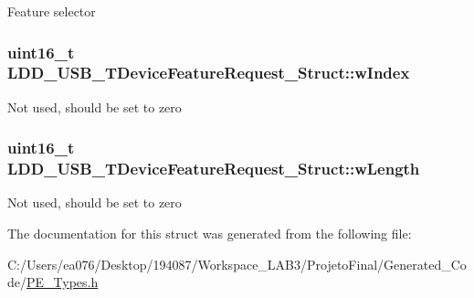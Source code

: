 Feature selector \hypertarget{struct_l_d_d___u_s_b___t_device_feature_request___struct_a261267b70741fe26898665df42fec10b}{
\subsubsection[{w\-Index}]{\setlength{\rightskip}{0pt plus 5cm}uint16\-\_\-t L\-D\-D\-\_\-\-U\-S\-B\-\_\-\-T\-Device\-Feature\-Request\-\_\-\-Struct\-::w\-Index}}\label{struct_l_d_d___u_s_b___t_device_feature_request___struct_a261267b70741fe26898665df42fec10b}
Not used, should be set to zero \hypertarget{struct_l_d_d___u_s_b___t_device_feature_request___struct_af0c222aa4585a132b2582fb1c290edc7}{
\subsubsection[{w\-Length}]{\setlength{\rightskip}{0pt plus 5cm}uint16\-\_\-t L\-D\-D\-\_\-\-U\-S\-B\-\_\-\-T\-Device\-Feature\-Request\-\_\-\-Struct\-::w\-Length}}\label{struct_l_d_d___u_s_b___t_device_feature_request___struct_af0c222aa4585a132b2582fb1c290edc7}
Not used, should be set to zero 

The documentation for this struct was generated from the following file\-:\begin{DoxyCompactItemize}
\item 
C\-:/\-Users/ea076/\-Desktop/194087/\-Workspace\-\_\-\-L\-A\-B3/\-Projeto\-Final/\-Generated\-\_\-\-Code/\hyperlink{_p_e___types_8h}{P\-E\-\_\-\-Types.\-h}\end{DoxyCompactItemize}
